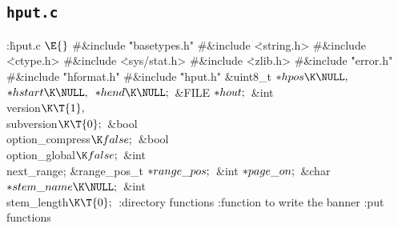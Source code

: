 \subsection{{\tt hput.c}}\label{writeshort}
\noindent
\Y\B\4:\.{hput.c }\X${}\E{}$\6
\8\#\&{include} \.{"basetypes.h"}\6
\8\#\&{include} \.{<string.h>}\6
\8\#\&{include} \.{<ctype.h>}\6
\8\#\&{include} \.{<sys/stat.h>}\6
\8\#\&{include} \.{<zlib.h>}\6
\8\#\&{include} \.{"error.h"}\6
\8\#\&{include} \.{"hformat.h"}\6
\8\#\&{include} \.{"hput.h"}\6
\&{uint8\_t} ${}{*}\index{hpos+\\{hpos}}\\{hpos}\K\NULL,{}$ ${}{*}\index{hstart+\\{hstart}}\\{hstart}\K\NULL,{}$ ${}{*}\index{hend+\\{hend}}\\{hend}\K\NULL;{}$\6
\&{FILE} ${}{*}\index{hout+\\{hout}}\\{hout};{}$\6
\&{int} \\{version}${}\K\T{1},{}$ \\{subversion}${}\K\T{0};{}$\6
\&{bool} \\{option\_compress}${}\K\\{false};{}$\6
\&{bool} \\{option\_global}${}\K\\{false};{}$\6
\&{int} \\{next\_range};\6
\&{range\_pos\_t} ${}{*}\index{range pos+\\{range\_pos}}\\{range\_pos};{}$\6
\&{int} ${}{*}\index{page on+\\{page\_on}}\\{page\_on};{}$\6
\&{char} ${}{*}\index{stem name+\\{stem\_name}}\\{stem\_name}\K\NULL;{}$\6
\&{int} \\{stem\_length}${}\K\T{0};{}$\7
:directory functions\X\6
:function to write the banner\X\6
:put functions\X
\Y
\fi

